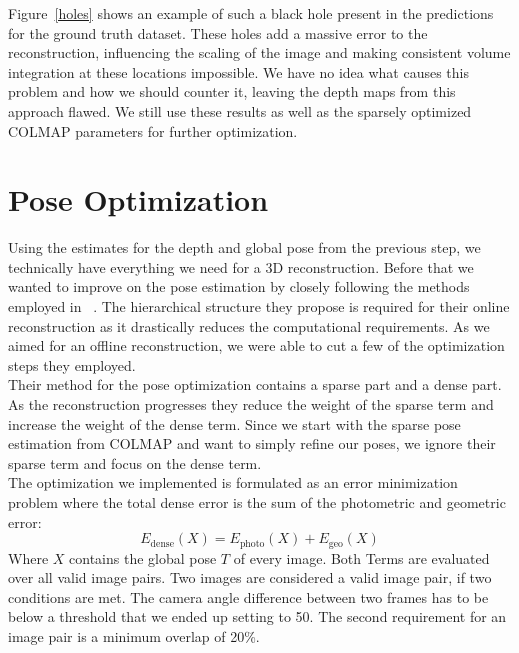         Figure~\ref{holes} shows an example of such a black hole present in the predictions for the ground truth dataset.
        These holes add a massive error to the reconstruction, influencing the scaling of the image and making consistent volume integration at these locations impossible.
        We have no idea what causes this problem and how we should counter it, leaving the depth maps from this approach flawed.
        We still use these results as well as the sparsely optimized COLMAP parameters for further optimization.
    
    \section{Pose Optimization}\label{sec:method_pose_optimization}
        Using the estimates for the depth and global pose from the previous step, we technically have everything we need for a 3D reconstruction.
        Before that we wanted to improve on the pose estimation by closely following the methods employed in ~\cite{dai2017bundlefusion}.
        The hierarchical structure they propose is required for their online reconstruction as it drastically reduces the computational requirements.
        As we aimed for an offline reconstruction, we were able to cut a few of the optimization steps they employed.\\
        Their method for the pose optimization contains a sparse part and a dense part.
        As the reconstruction progresses they reduce the weight of the sparse term and increase the weight of the dense term.
        Since we start with the sparse pose estimation from COLMAP and want to simply refine our poses, we ignore their sparse term and focus on the dense term.\\
        The optimization we implemented is formulated as an error minimization problem where the total dense error is the sum of the photometric and geometric error:
        \begin{equation}
            E_{\text{dense}}(X) = E_{\text{photo}}(X) + E_{\text{geo}}(X)
            \label{eq:edense}
        \end{equation}
        Where $X$ contains the global pose $T$ of every image.
        Both Terms are evaluated over all valid image pairs.
        Two images are considered a valid image pair, if two conditions are met.
        The camera angle difference between two frames has to be below a threshold that we ended up setting to 50\textdegree.
        The second requirement for an image pair is a minimum overlap of 20\%.
